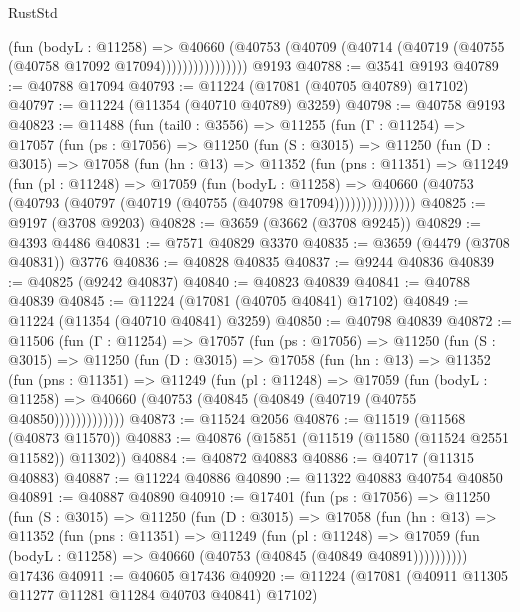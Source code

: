 \begin{lexlean}{RustStd}
\begin{coremodule}
                      (fun (bodyL : @11258) =>
                      @40660
                        (@40753
                          (@40709 (@40714 (@40719 (@40755 (@40758 @17092 @17094))))))))))))))))
    @9193
@40788 := @3541 @9193
@40789 := @40788 @17094
@40793 := @11224 (@17081 (@40705 @40789) @17102)
@40797 := @11224 (@11354 (@40710 @40789) @3259)
@40798 := @40758 @9193
@40823 := @11488
    (fun (tail0 : @3556) =>
    @11255
      (fun (Γ : @11254) =>
      @17057
        (fun (ps : @17056) =>
        @11250
          (fun (S : @3015) =>
          @11250
            (fun (D : @3015) =>
            @17058
              (fun (hn : @13) =>
              @11352
                (fun (pns : @11351) =>
                @11249
                  (fun (pl : @11248) =>
                  @17059
                    (fun (bodyL : @11258) =>
                    @40660 (@40753 (@40793 (@40797 (@40719 (@40755 (@40798 @17094)))))))))))))))
@40825 := @9197 (@3708 @9203)
@40828 := @3659 (@3662 (@3708 @9245))
@40829 := @4393 @4486
@40831 := @7571 @40829 @3370
@40835 := @3659 (@4479 (@3708 @40831)) @3776
@40836 := @40828 @40835
@40837 := @9244 @40836
@40839 := @40825 (@9242 @40837)
@40840 := @40823 @40839
@40841 := @40788 @40839
@40845 := @11224 (@17081 (@40705 @40841) @17102)
@40849 := @11224 (@11354 (@40710 @40841) @3259)
@40850 := @40798 @40839
@40872 := @11506
    (fun (Γ : @11254) =>
    @17057
      (fun (ps : @17056) =>
      @11250
        (fun (S : @3015) =>
        @11250
          (fun (D : @3015) =>
          @17058
            (fun (hn : @13) =>
            @11352
              (fun (pns : @11351) =>
              @11249
                (fun (pl : @11248) =>
                @17059
                  (fun (bodyL : @11258) =>
                  @40660 (@40753 (@40845 (@40849 (@40719 (@40755 @40850)))))))))))))
@40873 := @11524 @2056
@40876 := @11519 (@11568 (@40873 @11570))
@40883 := @40876 (@15851 (@11519 (@11580 (@11524 @2551 @11582)) @11302))
@40884 := @40872 @40883
@40886 := @40717 (@11315 @40883)
@40887 := @11224 @40886
@40890 := @11322 @40883 @40754 @40850
@40891 := @40887 @40890
@40910 := @17401
    (fun (ps : @17056) =>
    @11250
      (fun (S : @3015) =>
      @11250
        (fun (D : @3015) =>
        @17058
          (fun (hn : @13) =>
          @11352
            (fun (pns : @11351) =>
            @11249
              (fun (pl : @11248) =>
              @17059 (fun (bodyL : @11258) => @40660 (@40753 (@40845 (@40849 @40891))))))))))
    @17436
@40911 := @40605 @17436
@40920 := @11224 (@17081 (@40911 @11305 @11277 @11281 @11284 @40703 @40841) @17102)

\end{coremodule}
\end{lexlean}
